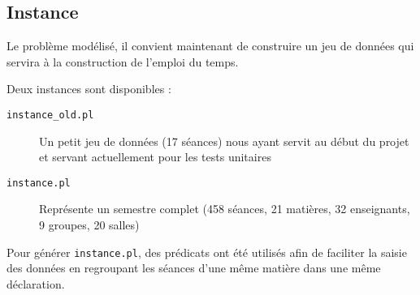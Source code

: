 \subsection{Instance}

Le problème modélisé, il convient maintenant de construire un jeu de données qui
servira à la construction de l'emploi du temps.

Deux instances sont disponibles :

\begin{description}

    \item[\texttt{instance\_old.pl}] Un petit jeu de données (17 séances) nous
        ayant servit au début du projet et servant actuellement pour les tests
        unitaires

    \item[\texttt{instance.pl}] Représente un semestre complet (458 séances,
        21 matières, 32 enseignants, 9 groupes, 20 salles)

\end{description}

Pour générer \texttt{instance.pl}, des prédicats ont été utilisés afin de
faciliter la saisie des données en regroupant les séances d'une même matière
dans une même déclaration.

